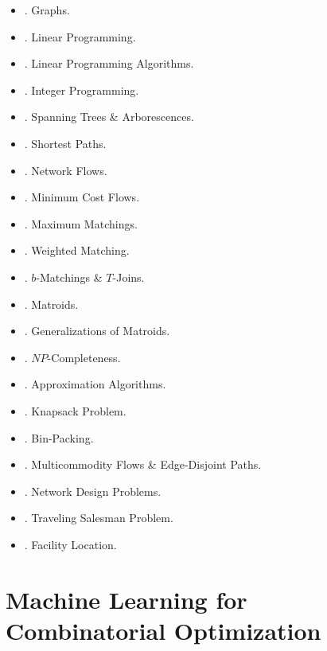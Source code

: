\documentclass{article}
\newtheorem{problem}{Problem}
\begin{document}
\begin{itemize}
    \item {. Graphs.}
    \item {. Linear Programming.}
    \item {. Linear Programming Algorithms.}
    \item {. Integer Programming.}
    \item {. Spanning Trees \& Arborescences.}
    \item {. Shortest Paths.}
    \item {. Network Flows.}
    \item {. Minimum Cost Flows.}
    \item {. Maximum Matchings.}
    \item {. Weighted Matching.}
    \item {. $b$-Matchings \& $T$-Joins.}
    \item {. Matroids.}
    \item {. Generalizations of Matroids.}
    \item {. $NP$-Completeness.}
    \item {. Approximation Algorithms.}
    \item {. Knapsack Problem.}
    \item {. Bin-Packing.}
    \item {. Multicommodity Flows \& Edge-Disjoint Paths.}
    \item {. Network Design Problems.}
    \item {. Traveling Salesman Problem.}
    \item {. Facility Location.}
\end{itemize}


\section{Machine Learning for Combinatorial Optimization}
\end{document}
